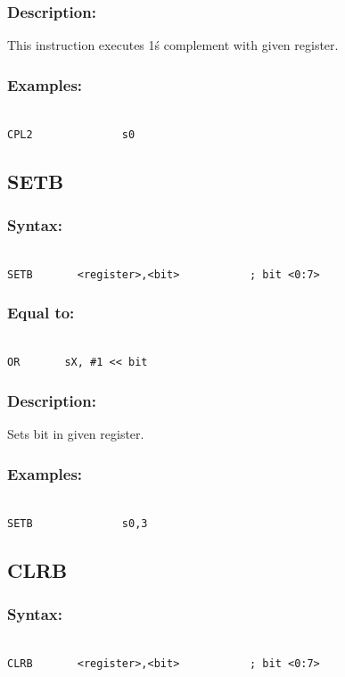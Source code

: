         \subsubsection{Description:}
            This instruction executes 1\'s complement with given register.

        \subsubsection{Examples:}
        {
            ~\\
            \usecodefont
            \verb'CPL2              s0'\\
        }

    \subsection{SETB}
        \subsubsection{Syntax:}
        {
            ~\\
            \usecodefont
            \verb'SETB       <register>,<bit>           ; bit <0:7>'
        }
        \subsubsection{Equal to:}
         {
            ~\\
            \usecodefont       
            \verb'OR       sX, #1 << bit'
        }
        \subsubsection{Description:}
            Sets bit in given register.

        \subsubsection{Examples:}
        {
            ~\\
            \usecodefont
            \verb'SETB              s0,3'\\
        }

    \subsection{CLRB}
        \subsubsection{Syntax:}
        {
            ~\\
            \usecodefont
            \verb'CLRB       <register>,<bit>           ; bit <0:7>'
        }
